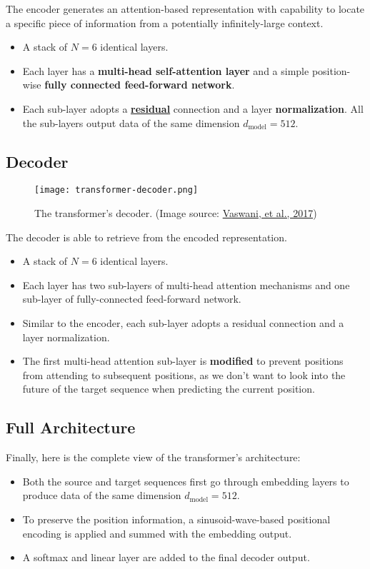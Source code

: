 \documentclass[12pt]{article}
\begin{document}
The encoder generates an attention-based representation with capability to locate a specific piece of information from a potentially infinitely-large context.
\begin{itemize}
    \item A stack of $N=6$ identical layers.
    \item Each layer has a \textbf{multi-head self-attention layer} and a simple position-wise \textbf{fully connected feed-forward network}.
    \item Each sub-layer adopts a \href{https://arxiv.org/pdf/1512.03385.pdf}{\textbf{residual}} connection and a layer \textbf{normalization}. All the sub-layers output data of the same dimension $d_\text{model} = 512$.
\end{itemize}

\subsection{Decoder}
\begin{figure}[H]
    \centering
    \texttt{[image: transformer-decoder.png]}
    \caption{The transformer's decoder. (Image source: \href{http://papers.nips.cc/paper/7181-attention-is-all-you-need.pdf}{Vaswani, et al., 2017})}
\end{figure}

The decoder is able to retrieve from the encoded representation.
\begin{itemize}
    \item A stack of $N = 6$ identical layers.
    \item Each layer has two sub-layers of multi-head attention mechanisms and one sub-layer of fully-connected feed-forward network.
    \item Similar to the encoder, each sub-layer adopts a residual connection and a layer normalization.
    \item The first multi-head attention sub-layer is \textbf{modified} to prevent positions from attending to subsequent positions, as we don’t want to look into the future of the target sequence when predicting the current position.
\end{itemize}

\subsection{Full Architecture}
Finally, here is the complete view of the transformer's architecture:
\begin{itemize}
    \item Both the source and target sequences first go through embedding layers to produce data of the same dimension $d_\text{model} =512$.
    \item To preserve the position information, a sinusoid-wave-based positional encoding is applied and summed with the embedding output.
    \item A softmax and linear layer are added to the final decoder output.
\end{itemize}
\end{document}
